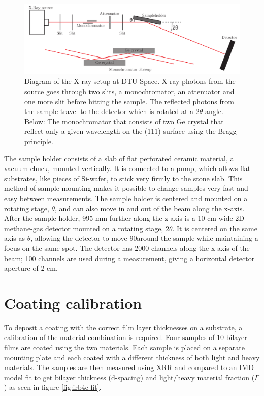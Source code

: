 \begin{figure}[!h]
  \center
  \includegraphics[width=0.8\linewidth]{figures/chamber/xraysetup.pdf}
\caption{\footnotesize Diagram of the X-ray setup at DTU Space. X-ray photons from the source goes through two slits, a monochromator, an attenuator and one more slit before hitting the sample. The reflected photons from the sample travel to the detector which is rotated at a $2\theta$ angle. Below: The monochromator that consists of two Ge crystal that reflect only a given wavelength on the (111) surface using the Bragg principle.}\label{fig:xraysetup}
\end{figure}

The sample holder consists of a slab of flat perforated ceramic material, a vacuum chuck, mounted vertically. It is connected to a pump, which allows flat substrates, like pieces of Si-wafer, to stick very firmly to the stone slab. This method of sample mounting makes it possible to change samples very fast and easy between measurements. The sample holder is centered and mounted on a rotating stage, $\theta$, and can also move in and out of the beam along the x-axis.\\
After the sample holder, 995 mm further along the z-axis is a 10 cm wide 2D methane-gas detector mounted on a rotating stage, $2\theta$. It is centered on the same axis as $\theta$, allowing the detector to move 90\degr around the sample while maintaining a focus on the same spot. The detector has 2000 channels along the x-axis of the beam; 100 channels are used during a measurement, giving a horizontal detector aperture of 2 cm.

\section{Coating calibration}\label{sec:coating_calib}
To deposit a coating with the correct film layer thicknesses on a substrate, a calibration of the material combination is required. Four samples of 10 bilayer films are coated using the two materials. Each sample is placed on a separate mounting plate and each coated with a different thickness of both light and heavy materials. The samples are then measured using XRR and compared to an IMD\cite{Windt:1998tb} model fit to get bilayer thickness (d-spacing) and light/heavy material fraction ($\Gamma$) as seen in figure \ref{fig:irb4c-fit}.

